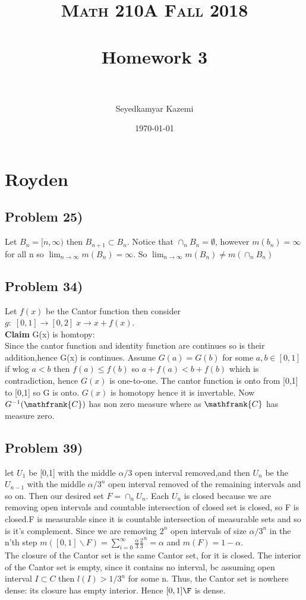\documentclass[paper=letter, fontsize=11pt]{scrartcl} %
\title{	
\normalfont \normalsize 
\textsc{Math 210A Fall 2018} \\ [25pt] %
\horrule{0.5pt} \\[0.4cm] %
\huge Homework 3\\ %
\horrule{2pt} \\[0.5cm] %
}
\author{Seyedkamyar Kazemi} %
\date{\normalsize\today} %
\begin{document}
\maketitle
\section{Royden}
\subsection{Problem 25)}
Let $B_n=[n,\infty)$ then $B_{n+1} \subset B_n$. Notice that $\cap_n B_n = \emptyset$, however $m(b_n) = \infty$ for all n so $\lim_{n \rightarrow \infty} m(B_n)=\infty$. So $\lim_{n \rightarrow \infty} m(B_n) \not = m(\cap_n B_n)$  
\subsection{Problem 34)}
Let $f(x)$ be the Cantor function then consider $g: \; [0,1] \rightarrow [0,2]\; x \rightarrow x+f(x)$. \\
\textbf{Claim} G(x) is homtopy:\\
Since the cantor function and identity function are continues so is their addition,hence G(x) is continues.
Assume $G(a)=G(b)$ for some $a,b \in [0,1]$
if wlog $a < b$ then $f(a) \leq f(b)$ so $a+f(a) < b +f(b)$ which is contradiction, hence $G(x)$ is one-to-one. 
The cantor function is onto from [0,1] to [0,1] so G is onto.
$G(x)$ is homotopy hence it is invertable. Now $G^{-1}(\mathfrank{C})$ has non zero measure where as $\mathfrank{C}$ has measure zero.
\subsection{Problem 39)}
let $U_1$ be [0,1] with the middle $\alpha/3$ open interval removed,and then $U_n$ be the $U_{n-1}$ with the middle $\alpha/3^{n}$ open interval removed of the remaining intervals and so on. Then our desired set $F=\cap_n U_n$. Each $U_n$ is closed because we are removing open intervals and countable intersection of closed set is closed, so F is closed.F is measurable since it is countable intersection of measurable sets and so is it's complement. Since we are removing $2^n$ open intervals of size $\alpha/3^n$ in the n'th step $m([0,1]\backslash F)=\sum_{i=0} ^{\infty} \frac{\alpha}{3} \frac{2}{3}^n=\alpha$ and $m(F)=1 - \alpha$.  
\\
The closure of the Cantor set is the same Cantor set, for it is closed. The interior of the Cantor set is empty, since it contains no interval, bc assuming open interval $I \subset C$ then $l(I)>1/3^n$ for some n. Thus, the Cantor set is nowhere dense: its closure has empty interior. Hence $[0,1]\F$ is dense.
\end{document}
